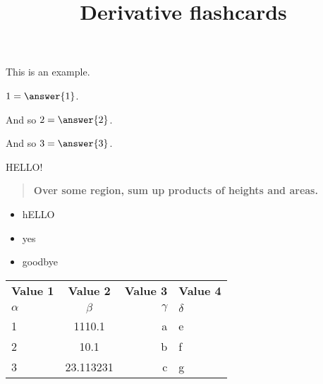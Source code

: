\documentclass{ximera}
\title{Derivative flashcards}
\begin{document}
\begin{example}
  This is an example.

  $1 = \answer{1}$.
  
  \begin{problem}
    And so $2 = \answer{2}$.
  \end{problem}

  \begin{problem}
    And so $3 = \answer{3}$.
  \end{problem}
  
  \begin{hint}
    HELLO!
  \end{hint}  
\end{example}

\begin{quote}
\textbf{Over \textcolor{red!50!black}{some region},
\textcolor{green!70!black!70!blue}{sum up} products of
\textcolor{purple!50!blue!90!black}{heights} and \textcolor{blue!70!green}{areas}.}
\end{quote}


\begin{itemize}
\item hELLO
\item yes
\item goodbye
\end{itemize}

    \begin{tabular}{l|S|r|l}
      \textbf{Value 1} & \textbf{Value 2} & \textbf{Value 3} & \textbf{Value 4}\\ %
      $\alpha$ & $\beta$ & $\gamma$ & $\delta$ \\ %
       & 1110.1 & a & e\\ %
      2 & 10.1 & b & f\\ %
      3 & 23.113231 & c & g\\ %
    \end{tabular}
    
\end{document}
